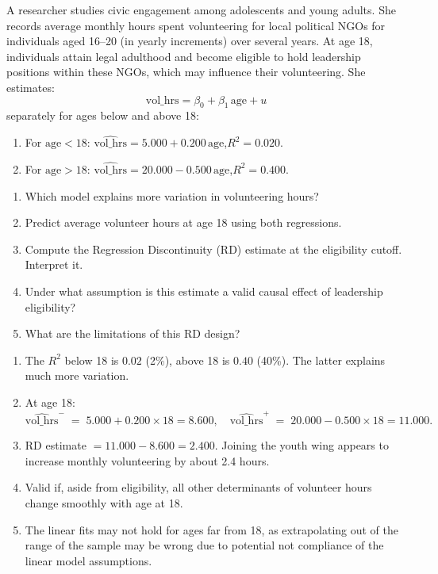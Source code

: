 \documentclass[11pt]{exam}
\begin{document}
\begin{questions}
\question[4]
A researcher studies civic engagement among adolescents and young adults. She records average monthly hours spent volunteering for local political NGOs for individuals aged 16–20 (in yearly increments) over several years. At age 18, individuals attain legal adulthood and become eligible to hold leadership positions within these NGOs, which may influence their volunteering. She estimates:
\[
\text{vol\_hrs} = \beta_0 + \beta_1\,\text{age} + u
\]
separately for ages below and above 18:
\begin{enumerate}[label=\arabic*.]
    \item For $\text{age}<18$: $\widehat{\text{vol\_hrs}} = 5.000 + 0.200\,\text{age}$,\quad $R^2=0.020$.
    \item For $\text{age}>18$: $\widehat{\text{vol\_hrs}} = 20.000 - 0.500\,\text{age}$,\quad $R^2=0.400$.
\end{enumerate}
\begin{enumerate}[label=(\alph*)]
    \item Which model explains more variation in volunteering hours?
    \item Predict average volunteer hours at age 18 using both regressions.
    \item Compute the Regression Discontinuity (RD) estimate at the eligibility cutoff. Interpret it.
    \item Under what assumption is this estimate a valid causal effect of leadership eligibility?
    \item What are the limitations of this RD design?%
\end{enumerate}

\begin{solution}
\begin{enumerate}[label=(\alph*)]
    \item The $R^2$ below 18 is $0.02$ (2\%), above 18 is $0.40$ (40\%). The latter explains much more variation.
    \item At age 18:
    \[
      \widehat{\text{vol\_hrs}}^-\;=\;5.000 + 0.200\times18 = 8.600,\quad
      \widehat{\text{vol\_hrs}}^+\;=\;20.000 - 0.500\times18 = 11.000.
    \]
    \item RD estimate $=11.000 - 8.600 = 2.400$. Joining the youth wing appears to increase monthly volunteering by about 2.4 hours.
    \item Valid if, aside from eligibility, all other determinants of volunteer hours change smoothly with age at 18.
    \item The linear fits may not hold for ages far from 18, as extrapolating out of the range of the sample may be wrong due to potential not compliance of the linear model assumptions.
\end{enumerate}
\end{solution}


\end{questions}
\end{document}
